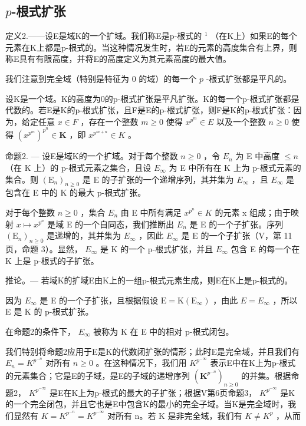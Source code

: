 \subsection{\texorpdfstring{\(p\)-根式扩张}{p-根式扩张}}

定义2.——设E是域K的一个扩域。我们称E是p-根式的 \(^{1}\) （在K上）如果E的每个元素在K上都是p-根式的。当这种情况发生时，若E的元素的高度集合有上界，则称E具有有限高度，并将E的高度定义为其元素高度的最大值。

我们注意到完全域（特别是特征为 0 的域）的每一个 \(p\) -根式扩张都是平凡的。

设K是一个域。K的高度为0的p-根式扩张是平凡扩张。K的每一个p-根式扩张都是代数的。若E是K的p-根式扩张，且F是E的p-根式扩张，则F是K的p-根式扩张：因为，给定任意 \(x \in F\) ，存在一个整数 \(m \geqslant 0\) 使得 \(x^{p^{m}} \in E\) 以及一个整数 \(n \geqslant 0\) 使得 \((x^{p^{m}})^{p^{n}} \in \mathbf{K}\) ，即 \(x^{p^{m+n}} \in K\) 。

命题2. --- 设E是域K的一个扩域。对于每个整数 \(n \geqslant 0\) ，令 \(E_{n}\) 为 E 中高度 \(\leqslant n\) （在 K 上）的 p-根式元素之集合，且设 \(E_{\infty}\) 为 E 中所有在 K 上为 p-根式元素的集合。则 \((\mathrm{E}_{n})_{n \geqslant 0}\) 是 E 的子扩张的一个递增序列，其并集为 \(E_{\infty}\) ，且 \(E_{\infty}\) 是包含在 E 中的 K 的最大 p-根式扩张。

对于每个整数 \(n \geqslant 0\) ，集合 \(E_{n}\) 由 E 中所有满足 \(x^{p^{n}} \in K\) 的元素 x 组成；由于映射 \(x \mapsto x^{p^{n}}\) 是域 E 的一个自同态，我们推断出 \(E_{n}\) 是 E 的一个子扩张。序列 \((\mathrm{E}_{n})_{n \geqslant 0}\) 是递增的，其并集为 \(E_{\infty}\) ，因此 \(E_{\infty}\) 是 E 的一个子扩张（V，第 11 页，命题 3）。显然， \(E_{\infty}\) 是 K 的一个 p-根式扩张，并且 \(E_{\infty}\) 包含 E 的每一个在 K 上是 p-根式的子扩张。

推论。--- 若域K的扩域E由K上的一组p-根式元素生成，则E在K上是p-根式的。

因为 \(E_{\infty}\) 是 E 的一个子扩张，且根据假设 \(\mathrm{E} = \mathrm{K}(\mathrm{E}_{\infty})\) ，由此 \(E = E_{\infty}\) ，所以 E 是 K 的 p-根式扩张。

在命题2的条件下， \(E_{\infty}\) 被称为 K 在 E 中的相对 p-根式闭包。

我们特别将命题2应用于E是K的代数闭扩张的情形；此时E是完全域，并且我们有 \(E_{n} = K^{p^{-n}}\) 对所有 \(n \geqslant 0\) 。在这种情况下，我们用 \(K^{p^{-\infty}}\) 表示E中在K上为p-根式的元素集合；它是E的子域，是E的子域的递增序列 \((\mathbf{K}^{p^{-n}})_{n \geqslant 0}\) 的并集。根据命题2， \(K^{p^{-\infty}}\) 是E在K上为p-根式的最大的子扩张；根据V第6页命题3， \(K^{p^{-\infty}}\) 是K的一个完全闭包，并且它也是E中包含K的最小的完全子域。当K是完全域时，我们显然有 \(K = K^{p^{-n}} = K^{p^{-\infty}}\) 对所有 n。若 K 是非完全域，我们有 \(K \neq K^{p}\) ，从而

